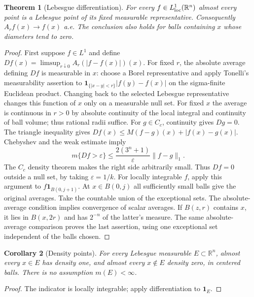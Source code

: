 \documentclass[11pt,oneside,openany]{book}
\newtheorem{theorem}{Theorem}[chapter]
\newtheorem{corollary}[theorem]{Corollary}
\theoremstyle{definition}
\theoremstyle{remark}
\newcommand{\R}{\mathbb R}\newcommand{\C}{\mathbb C}
\newcommand{\eps}{\varepsilon}\newcommand{\ee}{\varepsilon}
\newcommand{\one}{\mathbf1}\newcommand{\ind}[1]{\mathbf1_{#1}}
\newcommand{\family}[1]{}
\begin{document}
\begin{theorem}[Lebesgue differentiation]\family{D11.13.lebesgue_differentiation}\label{d11:13:lebesgue-differentiation}
For every $f\in L^1_{\rm loc}(\R^n)$ almost every point is a Lebesgue
point of its fixed measurable representative. Consequently $A_rf(x)\to f(x)$
a.e. The conclusion also holds for balls containing $x$ whose diameters
tend to zero.
\end{theorem}
\begin{proof}
First suppose $f\in L^1$ and define
$Df(x)=\limsup_{r\downarrow0}A_r(|f-f(x)|)(x)$.
For fixed $r$, the absolute average defining $Df$ is measurable in $x$:
choose a Borel representative and apply Tonelli's measurability assertion
to $\one_{\{|x-y|<r\}}|f(y)-f(x)|$ on the sigma-finite Euclidean
product. Changing back to the selected Lebesgue representative changes
this function of $x$ only on a measurable null set. For fixed $x$ the
average is continuous in $r>0$
by absolute continuity of the local integral and continuity of ball volume;
thus rational radii suffice. For $g\in C_c$, continuity gives $Dg=0$.
The triangle inequality gives
$Df(x)\leq M(f-g)(x)+|f(x)-g(x)|$.
Chebyshev and the weak estimate imply
\[
 m\{Df>\eps\}\leq \frac{2(3^n+1)}{\eps}\|f-g\|_1.
\]
The $C_c$ density theorem makes the right side arbitrarily small. Thus
$Df=0$ outside a null set, by taking $\eps=1/k$.
For locally integrable $f$, apply this argument to
$f\one_{B(0,j+1)}$. At $x\in B(0,j)$ all sufficiently small balls give
the original averages. Take the countable union of the exceptional sets.
The absolute-average condition implies convergence of scalar averages.
If $B(z,r)$ contains $x$, it lies in $B(x,2r)$ and has $2^{-n}$ of the
latter's measure. The same absolute-average comparison proves the last
assertion, using one exceptional set independent of the balls chosen.
\end{proof}

\begin{corollary}[Density points]\family{D11.13.density_points}\label{d11:13:density-points}
For every Lebesgue measurable $E\subset\R^n$, almost every $x\in E$
has density one, and almost every $x\notin E$ density zero, in centered
balls. There is no assumption $m(E)<\infty$.
\end{corollary}
\begin{proof}
The indicator is locally integrable; apply differentiation to $\one_E$.
\end{proof}
\end{document}
